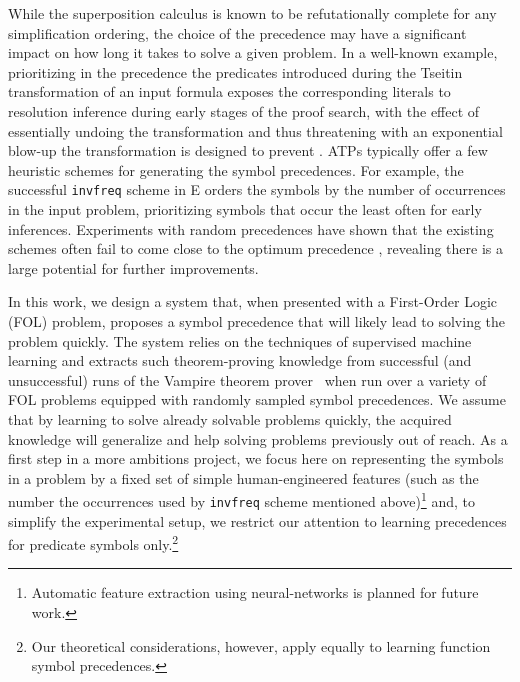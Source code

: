 While the superposition calculus is known \cite{DBLP:journals/logcom/BachmairG94} to be refutationally complete for any simplification ordering, the choice of the precedence may have a significant impact on how long it takes to solve a given problem.
In a well-known example, prioritizing in the precedence the predicates introduced during the Tseitin transformation of an input formula \cite{Tseitin1983} exposes the corresponding literals to resolution inference during early stages of the proof search,
with the effect of essentially undoing the transformation and thus threatening with an exponential blow-up
the transformation is designed to prevent \cite{Reger2016}.
%
ATPs typically offer a few heuristic schemes for generating the symbol precedences.
For example, the successful \texttt{invfreq} scheme in E \cite{E-manual} orders the symbols by the number of occurrences in the input problem,
prioritizing symbols that occur the least often for early inferences.
Experiments with random precedences have shown that the existing schemes often fail to come close to the optimum precedence \cite{RegerSuda2017}, revealing there is a large potential for further improvements.

In this work, we design a system that, when presented with a First-Order Logic (FOL) problem,
proposes a symbol precedence that will likely lead to solving the problem quickly.
The system relies on the techniques of supervised machine learning and extracts
such theorem-proving knowledge from successful (and unsuccessful) runs of 
the Vampire theorem prover~\cite{Kovacs2013} when run over a variety of FOL problems equipped
with randomly sampled symbol precedences. 
We assume that by learning to solve already solvable problems quickly,
the acquired knowledge will generalize and help solving problems previously out of reach.
As a first step in a more ambitions project,
we focus here on representing the symbols in a problem by a fixed set of simple human-engineered features
(such as the number the occurrences used by \texttt{invfreq} scheme mentioned above)\footnote{Automatic
feature extraction using neural-networks is planned for future work.}
and, to simplify the experimental setup, we restrict our attention to learning precedences for predicate symbols only.\footnote{
Our theoretical considerations, however, apply equally to learning function symbol precedences.}

